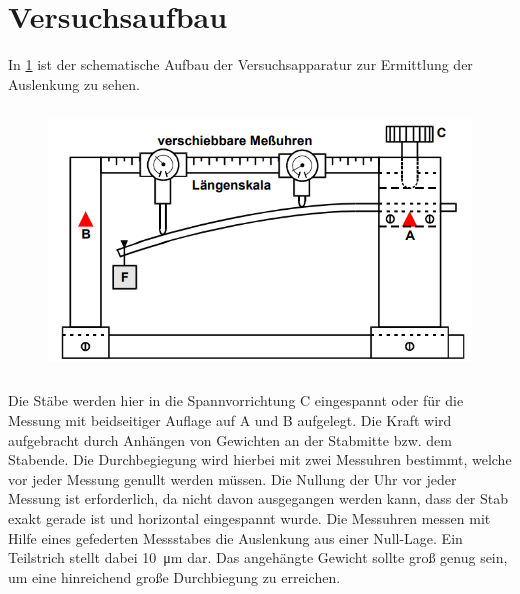 \section{Versuchsaufbau}
In \ref{Fig:Aufbau} ist der schematische Aufbau der Versuchsapparatur zur Ermittlung der Auslenkung zu sehen.
\begin{figure}[H]
    \centering
    \captionsetup{justification=centering}
    \includegraphics[height=7cm]{"Aufbau_Biegung.png"}
    \label{Fig:Aufbau}
\end{figure}
Die Stäbe werden hier in die Spannvorrichtung C eingespannt oder für die Messung mit beidseitiger Auflage auf A und B aufgelegt. Die Kraft wird aufgebracht durch Anhängen von Gewichten an der Stabmitte bzw. dem Stabende. Die Durchbegiegung wird hierbei mit zwei Messuhren bestimmt, welche vor jeder Messung genullt werden müssen. Die Nullung der Uhr vor jeder Messung ist erforderlich, da nicht davon ausgegangen werden kann, dass der Stab exakt gerade ist und horizontal eingespannt wurde. Die Messuhren messen mit Hilfe eines gefederten Messstabes die Auslenkung aus einer Null-Lage. Ein Teilstrich stellt dabei \SI{10}{\micro\metre} dar. Das angehängte Gewicht sollte groß genug sein, um eine hinreichend große Durchbiegung zu erreichen.